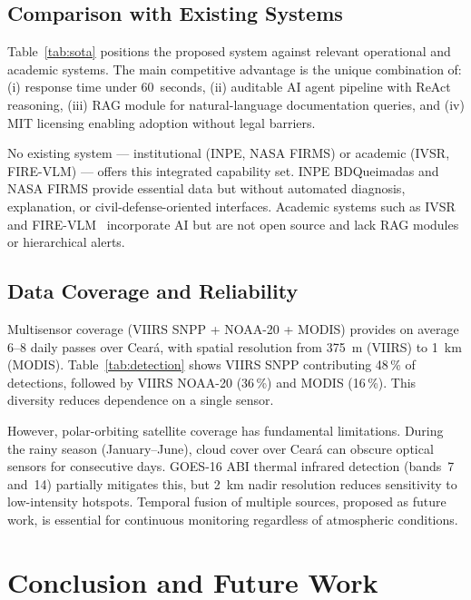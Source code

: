 \documentclass[preprint,12pt,times,numbers]{elsarticle}
\begin{document}
\subsection{Comparison with Existing Systems}

Table~\ref{tab:sota} positions the proposed system against relevant operational and academic systems. The main competitive advantage is the unique combination of: (i) response time under 60~seconds, (ii) auditable AI agent pipeline with ReAct reasoning, (iii) RAG module for natural-language documentation queries, and (iv) MIT licensing enabling adoption without legal barriers.

No existing system --- institutional (INPE, NASA FIRMS) or academic (IVSR, FIRE-VLM) --- offers this integrated capability set. INPE BDQueimadas and NASA FIRMS provide essential data but without automated diagnosis, explanation, or civil-defense-oriented interfaces. Academic systems such as IVSR~\cite{article:morsali2026} and FIRE-VLM~\cite{article:webb2026} incorporate AI but are not open source and lack RAG modules or hierarchical alerts.

\subsection{Data Coverage and Reliability}

Multisensor coverage (VIIRS SNPP + NOAA-20 + MODIS) provides on average 6--8 daily passes over Cear\'{a}, with spatial resolution from 375~m (VIIRS) to 1~km (MODIS). Table~\ref{tab:detection} shows VIIRS SNPP contributing 48\,\% of detections, followed by VIIRS NOAA-20 (36\,\%) and MODIS (16\,\%). This diversity reduces dependence on a single sensor.

However, polar-orbiting satellite coverage has fundamental limitations. During the rainy season (January--June), cloud cover over Cear\'{a} can obscure optical sensors for consecutive days. GOES-16 ABI thermal infrared detection (bands~7 and~14) partially mitigates this, but 2~km nadir resolution reduces sensitivity to low-intensity hotspots. Temporal fusion of multiple sources, proposed as future work, is essential for continuous monitoring regardless of atmospheric conditions.

\section{Conclusion and Future Work}
\label{sec:conclusion}
\end{document}
